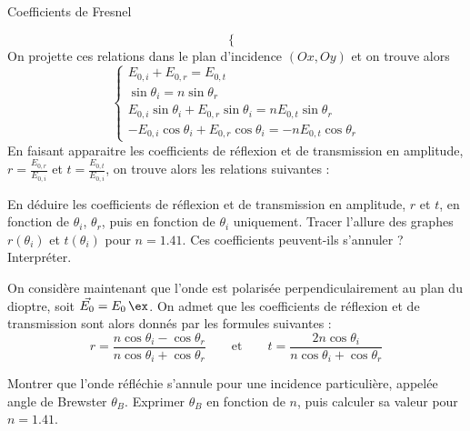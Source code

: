 \begin{exo}[PC][3][TD]{Coefficients de Fresnel}
\begin{quest}
{$$\begin{cases}
\end{cases}$$ 
On projette ces relations dans le plan d'incidence $(Ox,Oy)$ et on trouve alors
$$\begin{cases}
E_{0,i} + E_{0,r} = E_{0,t}\\
\sin \theta_i = n \sin \theta_r\\
E_{0,i} \sin \theta_i + E_{0,r} \sin \theta_i = n E_{0,t} \sin \theta_r\\
- E_{0,i} \cos \theta_i + E_{0,r} \cos \theta_i = - n E_{0,t} \cos \theta_r
\end{cases}$$
En faisant apparaitre les coefficients de réflexion et de transmission en amplitude, $r = \frac{E_{0,r}}{E_{0,i}}$ et $t = \frac{E_{0,t}}{E_{0,i}}$, on trouve alors les relations suivantes :
  }
\item En déduire les coefficients de réflexion et de transmission en amplitude, $r$ et $t$, en fonction de $\theta_i$, $\theta_r$, puis en fonction de $\theta_i$ uniquement. Tracer l'allure des graphes $r(\theta_i)$ et $t(\theta_i)$ pour $n=\num{1.41}$.  Ces coefficients peuvent-ils s'annuler ? Interpréter.
\end{quest}
On considère maintenant que l'onde est polarisée perpendiculairement au plan du dioptre, soit $\Vec{E_0} = E_0 \, \ex$. On admet que les coefficients de réflexion et de transmission sont alors donnés par les formules suivantes :
\begin{equation}
r = \frac{n \cos \theta_i - \cos \theta_r}{n \cos \theta_i + \cos \theta_r} \qquad\text{et}\qquad t = \frac{2 n \cos \theta_i}{n \cos \theta_i + \cos \theta_r}
\end{equation}
\begin{quest}
  \item	Montrer que l'onde réfléchie s'annule pour une incidence particulière, appelée angle de Brewster $\theta_B$. Exprimer $\theta_B$ en fonction de $n$, puis calculer sa valeur pour $n=\num{1.41}$.
\end{quest}
\end{exo}
